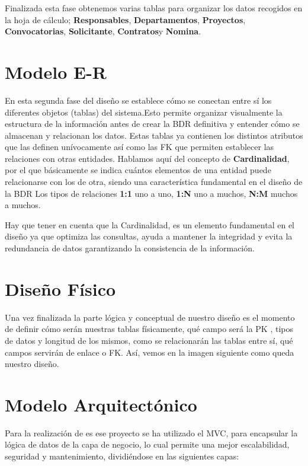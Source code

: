 Finalizada esta fase obtenemos varias tablas para organizar los datos recogidos en la hoja de cálculo; \textbf{Responsables}, \textbf{Departamentos}, \textbf{Proyectos}, \textbf{Convocatorias}, \textbf{Solicitante}, \textbf{Contratos}y \textbf{Nomina}.

\section{Modelo E-R}
En esta segunda fase del diseño se establece cómo se conectan entre sí los diferentes objetos (tablas) del sistema.Esto permite organizar visualmente la estructura de la información antes de crear la \acrshort{BDR} definitiva y entender cómo se almacenan y relacionan los datos.
Estas tablas ya contienen los distintos atributos que las definen unívocamente así como las \acrshort{FK} que permiten establecer las relaciones con otras entidades. 
Hablamos aquí del concepto de \textbf{\gls{Cardinalidad}}, por el que básicamente se indica cuántos elementos de una entidad puede relacionarse con los de otra, siendo una característica fundamental en el diseño de la \acrshort{BDR}
Los tipos de relaciones \textbf{1:1} uno a uno, \textbf{1:N} uno a muchos, \textbf{N:M} muchos a muchos.

Hay que tener en cuenta que la \gls{Cardinalidad}, es un elemento fundamental en el diseño ya que optimiza las consultas, ayuda a mantener la integridad y evita la redundancia de datos garantizando la consistencia de la información.

\section{Diseño Físico}
Una vez finalizada la parte lógica y conceptual de nuestro diseño es el momento de definir cómo serán nuestras tablas físicamente, qué campo será la \acrshort{PK} , tipos de datos y longitud de los mismos, como se relacionarán las tablas entre sí, qué campos servirán de enlace o \acrshort{FK}. Así, vemos en la imagen siguiente como queda nuestro diseño.

\section{Modelo Arquitectónico}
Para la realización de es ese proyecto se ha utilizado el \acrfull{MVC}, para encapsular la lógica de datos de la capa de negocio, lo cual permite una mejor escalabilidad, seguridad y mantenimiento, dividiéndose en las siguientes capas:
